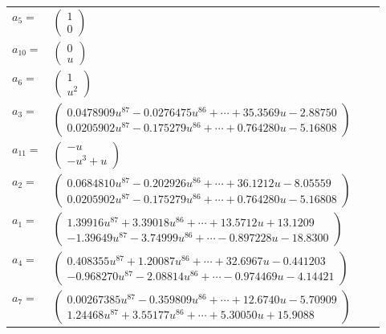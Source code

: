 \documentclass[1p]{elsarticle_modified}
\theoremstyle{definition}
\begin{document}
\begin{tabular}{m{7pt} m{180pt} m{7pt} m{180pt} }
\flushright $a_{5}=$&$\begin{pmatrix}1\\0\end{pmatrix}$ \\
\flushright $a_{10}=$&$\begin{pmatrix}0\\u\end{pmatrix}$ \\
\flushright $a_{6}=$&$\begin{pmatrix}1\\u^2\end{pmatrix}$ \\
\flushright $a_{3}=$&$\begin{pmatrix}0.0478909 u^{87}-0.0276475 u^{86}+\cdots+35.3569 u-2.88750\\0.0205902 u^{87}-0.175279 u^{86}+\cdots+0.764280 u-5.16808\end{pmatrix}$ \\
\flushright $a_{11}=$&$\begin{pmatrix}- u\\- u^3+u\end{pmatrix}$ \\
\flushright $a_{2}=$&$\begin{pmatrix}0.0684810 u^{87}-0.202926 u^{86}+\cdots+36.1212 u-8.05559\\0.0205902 u^{87}-0.175279 u^{86}+\cdots+0.764280 u-5.16808\end{pmatrix}$ \\
\flushright $a_{1}=$&$\begin{pmatrix}1.39916 u^{87}+3.39018 u^{86}+\cdots+13.5712 u+13.1209\\-1.39649 u^{87}-3.74999 u^{86}+\cdots-0.897228 u-18.8300\end{pmatrix}$ \\
\flushright $a_{4}=$&$\begin{pmatrix}0.408355 u^{87}+1.20087 u^{86}+\cdots+32.6967 u-0.441203\\-0.968270 u^{87}-2.08814 u^{86}+\cdots-0.974469 u-4.14421\end{pmatrix}$ \\
\flushright $a_{7}=$&$\begin{pmatrix}0.00267385 u^{87}-0.359809 u^{86}+\cdots+12.6740 u-5.70909\\1.24468 u^{87}+3.55177 u^{86}+\cdots+5.30050 u+15.9088\end{pmatrix}$ \\

\end{tabular}
\end{document}
